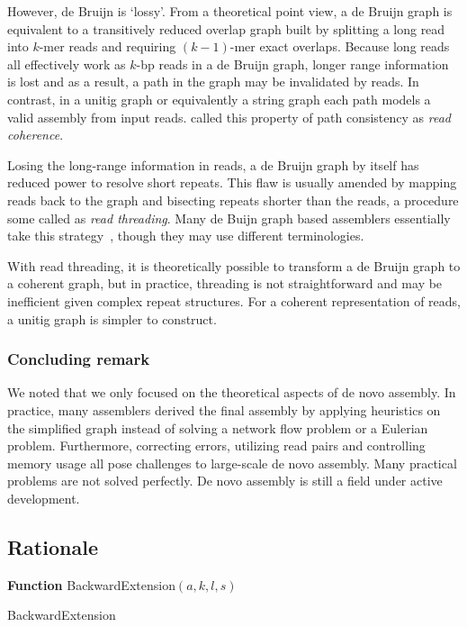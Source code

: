 \documentclass{bioinfo}
\begin{document}
\begin{methods}
However, de Bruijn is `lossy'. From a theoretical point view, a de Bruijn graph
is equivalent to a transitively reduced overlap graph built by splitting a long
read into $k$-mer reads and requiring $(k-1)$-mer exact overlaps. Because
long reads all effectively work as $k$-bp reads in a de Bruijn graph, longer
range information is lost and as a result, a path in the graph may be
invalidated by reads. In contrast, in a unitig graph or equivalently a string
graph each path models a valid assembly from input reads. \citet{Myers:2005bh}
called this property of path consistency as \emph{read coherence}.

Losing the long-range information in reads, a de Bruijn graph by itself has
reduced power to resolve short repeats. This flaw is usually amended by mapping
reads back to the graph and bisecting repeats shorter than the reads, a procedure
some called as \emph{read threading}. Many de Buijn graph based assemblers
essentially take this
strategy~\citep{Pevzner:2001vn,Chaisson:2009fk,Zerbino:2009ly,Li:2010vn},
though they may use different terminologies.

With read threading, it is theoretically possible to transform a de Bruijn graph
to a coherent graph, but in practice, threading is not straightforward and
may be inefficient given complex repeat structures. For a coherent representation
of reads, a unitig graph is simpler to construct.

\subsubsection{Concluding remark}
We noted that we only focused on the theoretical aspects of de novo assembly.
In practice, many assemblers derived the final assembly by applying heuristics
on the simplified graph instead of solving a network flow problem or a Eulerian
problem. Furthermore, correcting errors, utilizing read pairs and controlling memory
usage all pose challenges to large-scale de novo assembly. Many practical
problems are not solved perfectly. De novo assembly is still a field under
active development.

\subsection{Rationale}

\begin{algorithm}[h]
\DontPrintSemicolon
{}
\BlankLine
\textbf{Function} {\sc BackwardExtension}$(a,k,l,s)$
\caption{BackwardExtension}
\end{algorithm}


\end{methods}
\end{document}

